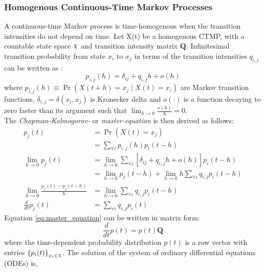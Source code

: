 \subsubsection{Homogenous Continuous-Time Markov Processes}
A continuous-time Markov process is time-homogenous when the transition intensities do not depend on time. Let X(t) be a homogenous CTMP, with a countable state space $ \rchi $ and transition intensity matrix $ \textbf{Q} $. Infinitesimal transition probability from state $ x_{i} $ to $ x_{j} $ in terms of the transition intensities $ q_{i,j} $ can be written as \cite{Cohn2010a}:
\begin{equation}
p_{i,j}(h)=\delta_{ij}+q_{i,j} h+o(h)
\label{eq:Markov_trans_func}
\end{equation}
where $ p_{i, j}(h) \equiv \operatorname{Pr}(X(t+h)=x_j\mid X(t)=x_i) $ are Markov transition functions, $ \delta_{i,j} = \delta(x_i,x_j)$ is Kronecker delta and $ o(\cdot) $ is a function decaying to zero faster than its argument such that $ \lim_{h \to 0} \frac{o(h)}{h} = 0 $.\\
The \textit{Chapman-Kolmogorov-} or \textit{master-equation} is then derived as follows:
\begin{align}
p_{j}(t) &= \operatorname{Pr}(X(t) = x_{j}) \nonumber\\
& =\sum_{\forall i} p_{i, j}(h) p_{i}(t-h) \nonumber \\
\lim_{h\rightarrow 0} p_{j}(t) 
& = \lim_{h\rightarrow 0} \sum_{\forall i} \left[ \delta_{ij}+q_{i,j} h+o(h)\right]  p_{i}(t-h) \nonumber \\ 
& = \lim_{h\rightarrow 0} p_{j}(t-h) + \lim_{h\rightarrow 0} h \sum_{\forall i} q_{i,j} p_{i}(t-h) \nonumber \\
\lim_{h\rightarrow 0} \frac{p_{j}(t) - p_{j}(t-h)}{h} 
&= \lim_{h\rightarrow 0} \sum_{\forall i} q_{i,j} p_{i}(t-h) \nonumber\\
\frac{d}{dt} p_{j}(t) & = \sum_{\forall i} q_{i,j} p_{i}(t)
\label{eq:master_equation}
\end{align}
Equation \ref{eq:master_equation} can be written in matrix form:
\begin{equation}
\frac{d}{dt} p(t) = p(t)\textbf{Q}
\end{equation}
where the time-dependent probability distribution $ p(t) $ is a row vector with entries $ \left\lbrace p_{i}(t)\right\rbrace_{x_{i}\in \rchi} $. The solution of the system of ordinary differential equations (ODEs) is, 
